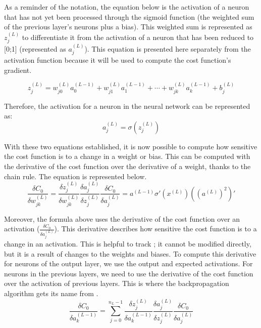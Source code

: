 ﻿\documentclass[12pt,a4paper,notitlepage]{article}
\begin{document}
As a reminder of the notation, the equation below is the activation of a neuron that has not yet been processed through the sigmoid function (the weighted sum of the previous layer's neurons plus a bias). This weighted sum is represented as \(z_j^{(L)}\) to differentiate it from the activation of a neuron that has been reduced to [0;1] (represented as \(a_j^{(L)}\)). This equation is presented here separately from the activation function because it will be used to compute the 
cost function's gradient.

\begin{displaymath}
 z_j^{(L)} = w_{j0}^{(L)}a_0^{(L-1)} + w_{j1}^{(L)}a_1^{(L-1)} + \cdots + w_{jk}^{(L)}a_k^{(L-1)} + b_j^{(L)}
\end{displaymath}

Therefore, the activation for a neuron in the neural network can be represented as:
\begin{displaymath}
 a_j^{(L)} = \sigma\left(z_j^{(L)}\right)
\end{displaymath}

With these two equations established, it is now possible to compute how sensitive the cost function is to a change in a weight or bias. This can be computed with the derivative of the cost function over the derivative of a weight, thanks to the chain rule. The equation is represented below.
\begin{displaymath}
 \frac{\delta C_0}{\delta w_{jk}^{(L)}} =
 \frac{\delta z_j^{(L)}}{\delta w_{jk}^{(L)}}
 \frac{\delta a_j^{(L)}}{\delta z_j^{(L)}}
 \frac{\delta C_0}{\delta a_j^{(L)}}
 = a^{(L-1)} \sigma\prime(x^{(L)})((a^{(L)})^2)\prime
\end{displaymath}

Moreover, the formula above uses the derivative of the cost function over an activation (\(\frac{\delta C_0}{\delta a_j^{(L)}}\)). This derivative describes how sensitive the cost function is to a change in an activation. This is helpful to track ; it cannot be modified directly, but it is a result of changes to the weights and biases. To compute this derivative for neurons of the output layer, we use the output and expected activations. For neurons in the previous layers, we need to use the derivative of the cost function over the activation of previous layers. This is where the backpropagation algorithm gets its name from \cite{sanderson_backpropagation_2017}.
\begin{displaymath}
 \frac{\delta C_0}{\delta a_{k}^{(L-1)}} = 
 \sum_{j=0}^{n_{L} - 1}
 \frac{\delta z_j^{(L)}}{\delta a_{k}^{(L-1)}}
 \frac{\delta a_j^{(L)}}{\delta z_j^{(L)}}
 \frac{\delta C_0}{\delta a_j^{(L)}}
\end{displaymath}
\end{document}
